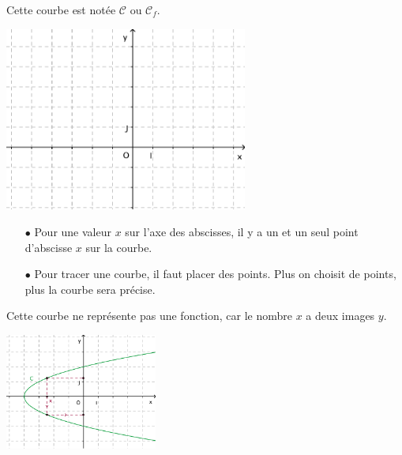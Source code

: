 Cette courbe est notée $\mathscr{C}$ ou $\mathscr{C}_f$.\\

{\centering 
  \includegraphics[width=8cm]{F_Axes}    
\par}

\begin{definition}
\end{definition}

\begin{itemize}
\item[$\bullet$] Pour une valeur $x$ sur l'axe des abscisses, il y a un et un
  seul point d'abscisse $x$ sur la courbe.
\item[$\bullet$] Pour tracer une courbe, il faut placer des points. Plus on
  choisit de points, plus la courbe sera précise.
\end{itemize}

\begin{rem}
  \begin{minipage}[t]{0.45\linewidth}
    Cette courbe ne représente pas une fonction, car le nombre $x$ a
    deux images $y$.    
  \end{minipage}
  \qquad
  \begin{minipage}[c]{0.4\linewidth}
    \includegraphics[width=5cm]{F_NonFct}
  \end{minipage}
\end{rem}


